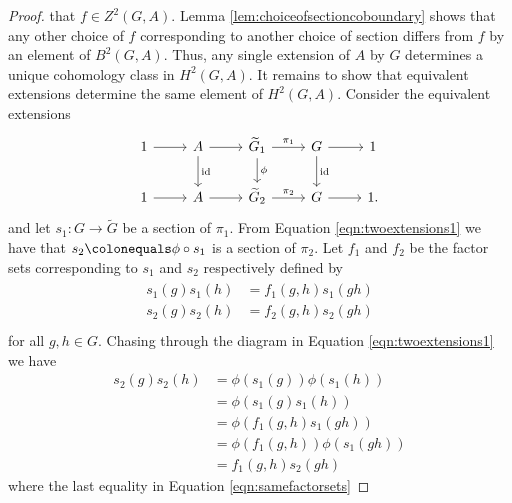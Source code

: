 \documentclass{dcthesis}
\newcommand{\wt}[1]{\widetilde{#1}}
\DeclareMathOperator{\id}{id}
\theoremstyle{definition}
\theoremstyle{remark}
\numberwithin{equation}{section}
\numberwithin{figure}{section}
\begin{document}
{{\begin{proof}
      that $f\in Z^2(G,A)$.
      Lemma \ref{lem:choiceofsectioncoboundary}
      shows that any other choice of $f$
      corresponding to another choice of section
      differs from $f$ by an element of
      $B^2(G,A)$.
      Thus,
      any single extension of $A$ by $G$
      determines a unique cohomology class
      in $H^2(G,A)$.
      It remains to show that equivalent extensions
      determine the same element of $H^2(G,A)$.
      Consider the
      equivalent extensions
      \begin{equation}
        \label{eqn:twoextensions1}
        \begin{tikzcd}
          1\arrow{r}&A\arrow{d}{\id}\arrow{r}{}&\wt{G}_1\arrow{r}{\pi_1}\arrow{d}{\phi}&G\arrow{d}{\id}\arrow{r}{}&1\\
          1\arrow{r}&A\arrow{r}{}&\wt{G}_2\arrow{r}{\pi_2}&G\arrow{r}{}&1.
        \end{tikzcd}
      \end{equation}
      and let
      $s_1\colon G\to\wt{G}$
      be a section of $\pi_1$.
      From Equation \ref{eqn:twoextensions1} we have that
      $s_2\colonequals \phi\circ s_1$ is a
      section of $\pi_2$.
      Let $f_1$ and $f_2$ be the factor sets
      corresponding to $s_1$
      and $s_2$ respectively
      defined by
      \begin{align}
        \label{eqn:twofactorsets}
        \begin{split}
          s_1(g)s_1(h) &= f_1(g,h)s_1(gh)\\
          s_2(g)s_2(h) &= f_2(g,h)s_2(gh)\\
        \end{split}
      \end{align}
      for all $g,h\in G$.
      Chasing through the diagram in
      Equation \ref{eqn:twoextensions1}
      we have
      \begin{equation}
        \label{eqn:samefactorsets}
        \begin{split}
          s_2(g)s_2(h)
          &=\phi(s_1(g))\phi(s_1(h))\\
          &=\phi(s_1(g)s_1(h))\\
          &=\phi(f_1(g,h)s_1(gh))\\
          &=\phi(f_1(g,h))\phi(s_1(gh))\\
          &=f_1(g,h)s_2(gh)
        \end{split}
      \end{equation}
      where the last equality in
      Equation \ref{eqn:samefactorsets}

\end{proof}}}
\end{document}
